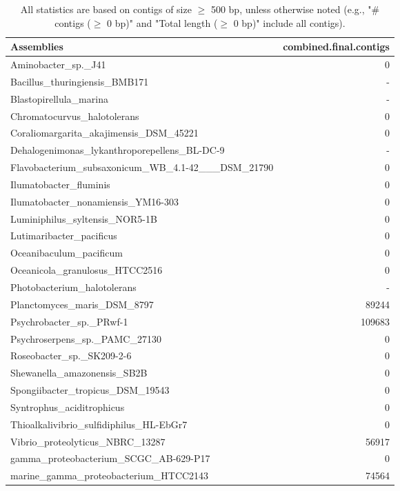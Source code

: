 \documentclass[12pt,a4paper]{article}
\begin{document}
\begin{table}[ht]
\begin{center}
\caption{All statistics are based on contigs of size $\geq$ 500 bp, unless otherwise noted (e.g., "\# contigs ($\geq$ 0 bp)" and "Total length ($\geq$ 0 bp)" include all contigs).}
\begin{tabular}{|l*{1}{|r}|}
\hline
Assemblies & combined.final.contigs \\ \hline
Aminobacter\_sp.\_J41 & 0 \\ \hline
Bacillus\_thuringiensis\_BMB171 & - \\ \hline
Blastopirellula\_marina & - \\ \hline
Chromatocurvus\_halotolerans & 0 \\ \hline
Coraliomargarita\_akajimensis\_DSM\_45221 & 0 \\ \hline
Dehalogenimonas\_lykanthroporepellens\_BL-DC-9 & - \\ \hline
Flavobacterium\_subsaxonicum\_WB\_4.1-42\_\_\_DSM\_21790 & 0 \\ \hline
Ilumatobacter\_fluminis & 0 \\ \hline
Ilumatobacter\_nonamiensis\_YM16-303 & 0 \\ \hline
Luminiphilus\_syltensis\_NOR5-1B & 0 \\ \hline
Lutimaribacter\_pacificus & 0 \\ \hline
Oceanibaculum\_pacificum & 0 \\ \hline
Oceanicola\_granulosus\_HTCC2516 & 0 \\ \hline
Photobacterium\_halotolerans & - \\ \hline
Planctomyces\_maris\_DSM\_8797 & 89244 \\ \hline
Psychrobacter\_sp.\_PRwf-1 & 109683 \\ \hline
Psychroserpens\_sp.\_PAMC\_27130 & 0 \\ \hline
Roseobacter\_sp.\_SK209-2-6 & 0 \\ \hline
Shewanella\_amazonensis\_SB2B & 0 \\ \hline
Spongiibacter\_tropicus\_DSM\_19543 & 0 \\ \hline
Syntrophus\_aciditrophicus & 0 \\ \hline
Thioalkalivibrio\_sulfidiphilus\_HL-EbGr7 & 0 \\ \hline
Vibrio\_proteolyticus\_NBRC\_13287 & 56917 \\ \hline
gamma\_proteobacterium\_SCGC\_AB-629-P17 & 0 \\ \hline
marine\_gamma\_proteobacterium\_HTCC2143 & 74564 \\ \hline
\end{tabular}
\end{center}
\end{table}
\end{document}
